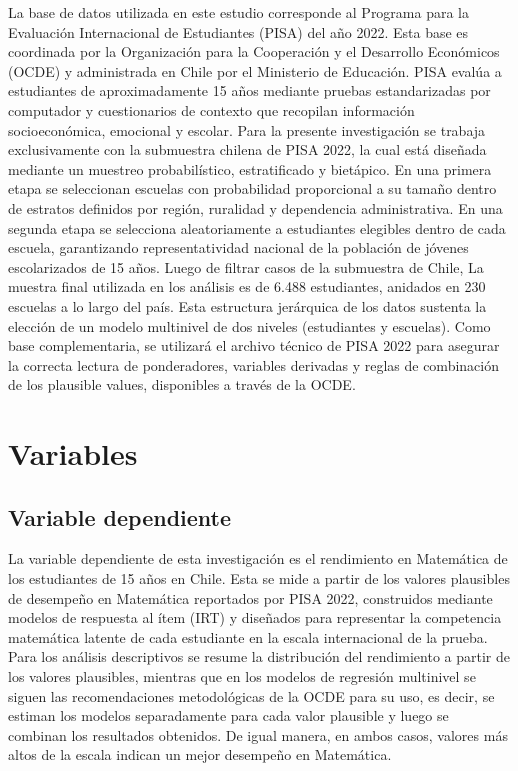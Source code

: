 \documentclass[
  spanish,
  a4paper,
  oneside]{scrbook}
\begin{document}
La base de datos utilizada en este estudio corresponde al Programa para
la Evaluación Internacional de Estudiantes (PISA) del año 2022. Esta
base es coordinada por la Organización para la Cooperación y el
Desarrollo Económicos (OCDE) y administrada en Chile por el Ministerio
de Educación. PISA evalúa a estudiantes de aproximadamente 15 años
mediante pruebas estandarizadas por computador y cuestionarios de
contexto que recopilan información socioeconómica, emocional y escolar.
Para la presente investigación se trabaja exclusivamente con la
submuestra chilena de PISA 2022, la cual está diseñada mediante un
muestreo probabilístico, estratificado y bietápico. En una primera etapa
se seleccionan escuelas con probabilidad proporcional a su tamaño dentro
de estratos definidos por región, ruralidad y dependencia
administrativa. En una segunda etapa se selecciona aleatoriamente a
estudiantes elegibles dentro de cada escuela, garantizando
representatividad nacional de la población de jóvenes escolarizados de
15 años. Luego de filtrar casos de la submuestra de Chile, La muestra
final utilizada en los análisis es de 6.488 estudiantes, anidados en 230
escuelas a lo largo del país. Esta estructura jerárquica de los datos
sustenta la elección de un modelo multinivel de dos niveles (estudiantes
y escuelas). Como base complementaria, se utilizará el archivo técnico
de PISA 2022 para asegurar la correcta lectura de ponderadores,
variables derivadas y reglas de combinación de los plausible values,
disponibles a través de la OCDE.

\section{Variables}\label{variables}

\subsection{Variable dependiente}\label{variable-dependiente}

La variable dependiente de esta investigación es el rendimiento en
Matemática de los estudiantes de 15 años en Chile. Esta se mide a partir
de los valores plausibles de desempeño en Matemática reportados por PISA
2022, construidos mediante modelos de respuesta al ítem (IRT) y
diseñados para representar la competencia matemática latente de cada
estudiante en la escala internacional de la prueba. Para los análisis
descriptivos se resume la distribución del rendimiento a partir de los
valores plausibles, mientras que en los modelos de regresión multinivel
se siguen las recomendaciones metodológicas de la OCDE para su uso, es
decir, se estiman los modelos separadamente para cada valor plausible y
luego se combinan los resultados obtenidos. De igual manera, en ambos
casos, valores más altos de la escala indican un mejor desempeño en
Matemática.
\end{document}
